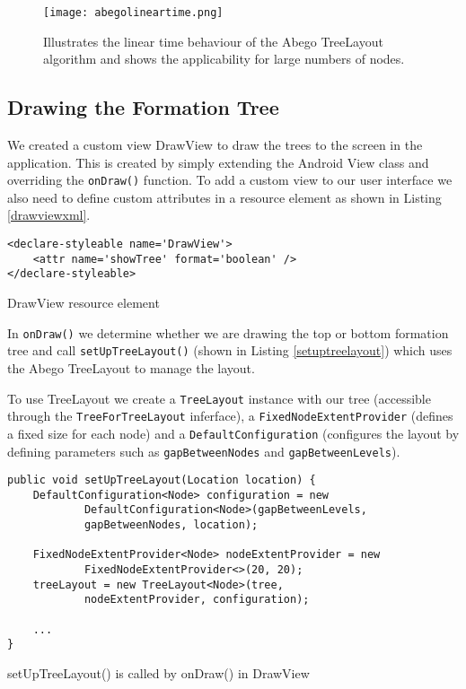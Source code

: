 \documentclass{report}
\begin{document}
\begin{figure}[ht]
    \centering
    \texttt{[image: abegolineartime.png]}
    \caption{Illustrates the linear time behaviour of the Abego TreeLayout algorithm\cite{abegolineartime} and shows the applicability for large numbers of nodes.}
    \label{abegolineartime}
\end{figure}

\subsection{Drawing the Formation Tree}

We created a custom view DrawView to draw the trees to the screen in the application. This is created by simply extending the Android View class and overriding the {\tt onDraw()} function. To add a custom view to our user interface we also need to define custom attributes in a resource element as shown in Listing \ref{drawviewxml}.

\begin{listing}[ht]
\begin{verbatim}
<declare-styleable name='DrawView'>
    <attr name='showTree' format='boolean' />
</declare-styleable>
\end{verbatim}
\caption{DrawView resource element}
\label{drawviewxml}
\end{listing}

In {\tt onDraw()} we determine whether we are drawing the top or bottom formation tree and call {\tt setUpTreeLayout()} (shown in Listing \ref{setuptreelayout}) which uses the Abego TreeLayout to manage the layout.

To use TreeLayout we create a {\tt TreeLayout} instance with our tree (accessible through the {\tt TreeForTreeLayout} inferface), a {\tt FixedNodeExtentProvider} (defines a fixed size for each node) and a {\tt DefaultConfiguration} (configures the layout by defining parameters such as {\tt gapBetweenNodes} and {\tt gapBetweenLevels}).

\begin{listing}[ht]
\begin{verbatim}
public void setUpTreeLayout(Location location) {
    DefaultConfiguration<Node> configuration = new 
            DefaultConfiguration<Node>(gapBetweenLevels, 
            gapBetweenNodes, location);

    FixedNodeExtentProvider<Node> nodeExtentProvider = new 
            FixedNodeExtentProvider<>(20, 20);
    treeLayout = new TreeLayout<Node>(tree,
            nodeExtentProvider, configuration);

    ...
}
\end{verbatim}
\caption{setUpTreeLayout() is called by onDraw() in DrawView}
\label{setuptreelayout}
\end{listing}
\end{document}
